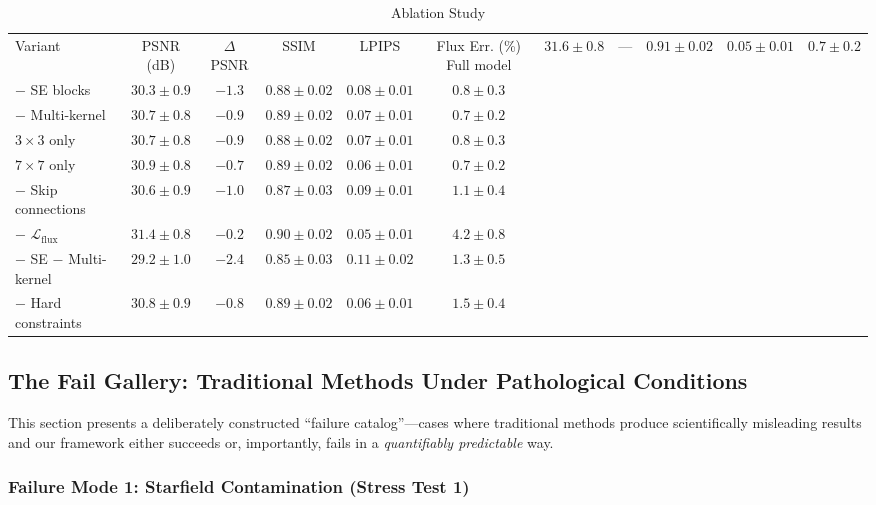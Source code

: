 \documentclass[usenatbib]{mnras}
\begin{document}
\begin{table}
\centering
\caption{Ablation Study}\label{tab:ablation}
\begin{tabular}{lccccc}
\toprule
Variant & PSNR (dB) & $\Delta$PSNR & SSIM & LPIPS & Flux Err. (\%)
\midrule
Full model & $\mathbf{31.6 \pm 0.8}$ & --- & $\mathbf{0.91 \pm 0.02}$ & $\mathbf{0.05 \pm 0.01}$ & $\mathbf{0.7 \pm 0.2}$ \\
$-$ SE blocks & $30.3 \pm 0.9$ & $-1.3$ & $0.88 \pm 0.02$ & $0.08 \pm 0.01$ & $0.8 \pm 0.3$ \\
$-$ Multi-kernel & $30.7 \pm 0.8$ & $-0.9$ & $0.89 \pm 0.02$ & $0.07 \pm 0.01$ & $0.7 \pm 0.2$ \\
$3\times3$ only & $30.7 \pm 0.8$ & $-0.9$ & $0.88 \pm 0.02$ & $0.07 \pm 0.01$ & $0.8 \pm 0.3$ \\
$7\times7$ only & $30.9 \pm 0.8$ & $-0.7$ & $0.89 \pm 0.02$ & $0.06 \pm 0.01$ & $0.7 \pm 0.2$ \\
$-$ Skip connections & $30.6 \pm 0.9$ & $-1.0$ & $0.87 \pm 0.03$ & $0.09 \pm 0.01$ & $1.1 \pm 0.4$ \\
$-$ $\mathcal{L}_{\text{flux}}$ & $31.4 \pm 0.8$ & $-0.2$ & $0.90 \pm 0.02$ & $0.05 \pm 0.01$ & $4.2 \pm 0.8$ \\
$-$ SE $-$ Multi-kernel & $29.2 \pm 1.0$ & $-2.4$ & $0.85 \pm 0.03$ & $0.11 \pm 0.02$ & $1.3 \pm 0.5$ \\
$-$ Hard constraints & $30.8 \pm 0.9$ & $-0.8$ & $0.89 \pm 0.02$ & $0.06 \pm 0.01$ & $1.5 \pm 0.4$ \\
\bottomrule
\end{tabular}
\end{table}


\subsection{The Fail Gallery: Traditional Methods Under Pathological Conditions}\label{sec:fail_gallery}

This section presents a deliberately constructed ``failure catalog''---cases where traditional methods produce scientifically misleading results and our framework either succeeds or, importantly, fails in a \textit{quantifiably predictable} way.

\subsubsection{Failure Mode 1: Starfield Contamination (Stress Test 1)}
\end{document}
